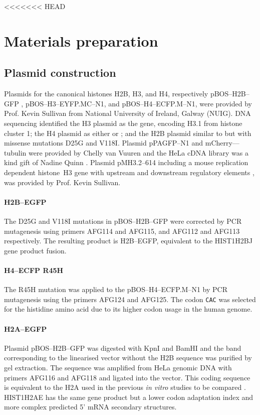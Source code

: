 <<<<<<< HEAD
\section{Materials preparation}

  \subsection{Plasmid construction}
    Plasmids for the canonical histones H2B, H3, and H4,
    respectively pBOS--H2B--GFP \citep{KevinH2BGFP},
    pBOS--H3--EYFP.MC--N1, and pBOS--H4--ECFP.M--N1,
    were provided by Prof. Kevin Sullivan from National University of Ireland,
    Galway (NUIG). DNA sequencing identified the H3 plasmid as the  gene,
    encoding H3.1 from histone cluster 1; the H4 plasmid as either
     or ;
    and the H2B plasmid similar to  but with missense mutations D25G and V118I.
    Plasmid pPAGFP--N1 and mCherry--\textalpha--tubulin were provided by Chelly van Vuuren
    and the HeLa cDNA library was a kind gift of Nadine Quinn \citep{NadineThesis}.
    Plasmid pMH3.2--614 including a mouse replication dependent histone~H3
    gene with upstream and downstream regulatory elements \citep{pMH3-plasmid},
    was provided by Prof. Kevin Sullivan.

    \paragraph{H2B--EGFP}
      The D25G and V118I mutations in pBOS--H2B--GFP were corrected by PCR mutagenesis
      using primers AFG114 and AFG115, and AFG112 and AFG113 respectively.
      The resulting product is H2B--EGFP, equivalent to the HIST1H2BJ gene product fusion.

    \paragraph{H4--ECFP R45H}
      The R45H mutation was applied to the pBOS--H4--ECFP.M--N1 by
      PCR mutagenesis using the primers AFG124 and AFG125. The codon
      \texttt{CAC} was selected for the histidine amino acid due to its
      higher codon usage in the human genome\citep{codon_usage}.

    \paragraph{H2A--EGFP}
      Plasmid pBOS--H2B--GFP was digested with KpnI and BamHI
      and the band corresponding to the linearised vector without the H2B sequence
      was purified by gel extraction. The  sequence was amplified
      from HeLa genomic DNA with primers AFG116 and AFG118 and ligated into the vector.
      This coding sequence is equivalent to the H2A used in the previous
      \textit{in vitro} studies to be compared \citep{flaus2004sin}.
      HIST1H2AE has the same gene product but a lower codon adaptation index
      and more complex predicted 5' mRNA secondary structures.

